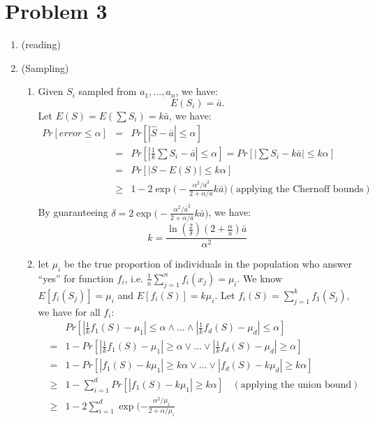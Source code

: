 \documentclass[11pt]{article}
\begin{document}
\section{Problem 3}
\begin{enumerate}
	\item (reading)
	\item (Sampling)
	\begin{enumerate}
		\item 
		Given $S_i$ sampled from $a_1, \ldots, a_n$, we have:
		\[
		E(S_i) = \bar{a}.
		\]
		Let $E(S) = E(\sum S_i) = k \bar{a}$, we have:
		\[
		\begin{array}{ccl}
		Pr[error \leq \alpha] 
		& = & Pr[|\hat{S} - \bar{a}| \leq \alpha]\\
		& = & Pr[|\frac{1}{k}\sum S_i - \bar{a}| \leq \alpha] = Pr[|\sum S_i - k\bar{a}| \leq k\alpha]\\
		& = & Pr[|S - E(S)| \leq k\alpha]\\
		& \geq & 1 - 2 \exp \big( 
		- \frac{\alpha^2 / \bar{a}^2}
		{2 + \alpha / \bar{a}} k \bar{a} \big)
		(\text{applying the Chernoff bounds})\\
		\end{array}
		\]
		By guaranteeing $\delta = 2 \exp \big( 
		- \frac{\alpha^2 / \bar{a}^2}
		{2 + \alpha / \bar{a}} k \bar{a} \big)$, we have:
		\[
		k = \frac{\ln(\frac{2}{\delta})(2 + \frac{\alpha}{\bar{a}})\bar{a}}
		{\alpha^2}
		\]
		\item
		let $\mu_i$ be the true proportion of individuals in the population who answer ``yes'' for function $f_i$, i.e. $\frac{1}{n}\sum_{j = 1}^{n}f_i(x_j) = \mu_i$. We know $E[f_i(S_j)] = \mu_i$ and $E[f_i(S)] = k\mu_i$. Let $f_i(S) = \sum_{j = 1}^{k}f_1(S_j)$, we have for all $f_i$:
		\[
		\begin{array}{ccl}
		& & Pr[
		|\frac{1}{k}f_1(S) - \mu_1| 
		\leq \alpha 
		\land \ldots \land 
		|\frac{1}{k}f_d(S) - \mu_d| 
		\leq \alpha]\\
		& = & 1 - Pr[
		|\frac{1}{k}f_1(S) - \mu_1| 
		\geq \alpha  
		\lor \ldots \lor 
		|\frac{1}{k}f_d(S) - \mu_d|
		\geq \alpha] \\
		& = & 1 - Pr[
		|f_1(S) - k\mu_1| 
		\geq k\alpha  
		\lor \ldots \lor 
		|f_d(S) - k \mu_d|
		\geq k\alpha] \\
		& \geq & 1 - \sum\limits_{i = 1}^{d} 
		Pr[|f_1(S) - k \mu_1| \geq k \alpha]
		~~~~(\text{applying the union bound})\\
		& \geq & 1 - 2 \sum\limits_{i = 1}^{d}
		\exp(- \frac{\alpha^2 / \mu_i}{ 2 + \alpha / \mu_i}

\end{array}\]
\end{enumerate}
\end{enumerate}
\end{document}
